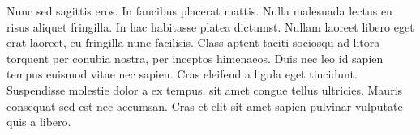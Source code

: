 Nunc sed sagittis eros. In faucibus placerat mattis. Nulla malesuada lectus eu risus aliquet fringilla. In hac habitasse platea dictumst. Nullam laoreet libero eget erat laoreet, eu fringilla nunc facilisis. Class aptent taciti sociosqu ad litora torquent per conubia nostra, per inceptos himenaeos. Duis nec leo id sapien tempus euismod vitae nec sapien. Cras eleifend a ligula eget tincidunt. Suspendisse molestie dolor a ex tempus, sit amet congue tellus ultricies. Mauris consequat sed est nec accumsan. Cras et elit sit amet sapien pulvinar vulputate quis a libero. 